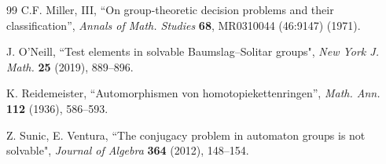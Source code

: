 \documentclass[english]{amsart}
\theoremstyle{definition}
\begin{document}
\begin{thebibliography}{99}
 C.F. Miller, III, ``On group-theoretic decision problems and their classification'', \textit{Annals of Math. Studies} \textbf{68}, MR0310044 (46:9147) (1971).

 J. O'Neill, ``Test elements in solvable Baumslag--Solitar groups", \textit{New York J. Math.} \textbf{25} (2019), 889--896.

 K. Reidemeister, ``Automorphismen von homotopiekettenringen'', \textit{Math. Ann.} \textbf{112} (1936), 586--593.

 Z. Sunic, E. Ventura, ``The conjugacy problem in automaton groups is not solvable", \emph{Journal of Algebra} \textbf{364} (2012), 148--154.
\end{thebibliography}
\end{document}
